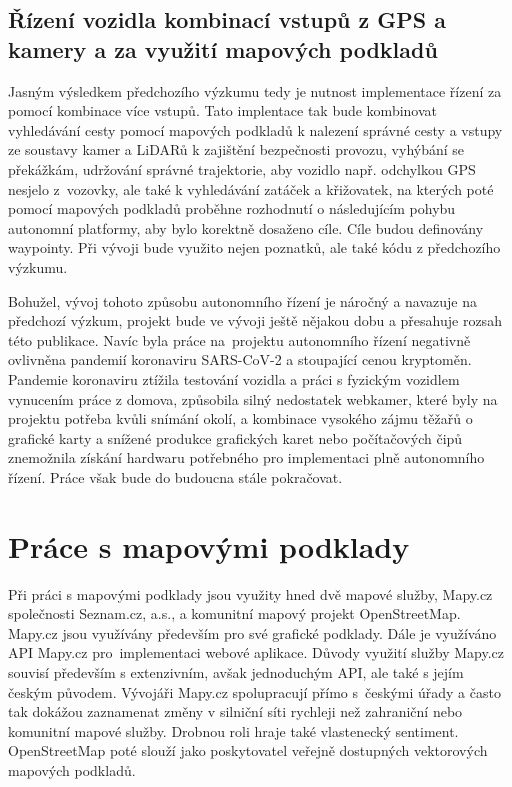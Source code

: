 \documentclass[czech, bachelor]{diploma}
\begin{document}
\section{Řízení vozidla kombinací vstupů z GPS a kamery a za využití mapových podkladů} \label{combination-of-driving-inputs}

Jasným výsledkem předchozího výzkumu tedy je nutnost implementace řízení za pomocí kombinace více vstupů. Tato implentace tak bude
kombinovat vyhledávání cesty pomocí mapových podkladů k nalezení správné cesty a vstupy ze soustavy kamer a LiDARů k zajištění
bezpečnosti provozu, vyhýbání se překážkám, udržování správné trajektorie, aby vozidlo např. odchylkou GPS nesjelo z~vozovky,
ale také k vyhledávání zatáček a křižovatek, na kterých poté pomocí mapových podkladů proběhne rozhodnutí o následujícím pohybu
autonomní platformy, aby bylo korektně dosaženo cíle. Cíle budou definovány waypointy. Při vývoji bude využito nejen poznatků,
ale také kódu z předchozího výzkumu.

Bohužel, vývoj tohoto způsobu autonomního řízení je náročný a navazuje na předchozí výzkum, projekt bude ve vývoji ještě nějakou
dobu a přesahuje rozsah této publikace. Navíc byla práce na~projektu autonomního řízení negativně ovlivněna pandemií koronaviru
SARS-CoV-2\cite{pandemic-source} a stoupající cenou kryptoměn\cite{bitcoin-rally-source}. Pandemie koronaviru ztížila testování
vozidla a práci s fyzickým vozidlem vynucením práce z domova, způsobila silný nedostatek webkamer, které byly na projektu potřeba
kvůli snímání okolí, a kombinace vysokého zájmu těžařů o grafické karty a snížené produkce grafických karet nebo počítačových čipů
znemožnila získání hardwaru potřebného pro implementaci plně autonomního řízení\cite{bitcoin-miners-gpu-source,
webcam-shortage-source}. Práce však bude do budoucna stále pokračovat.

\chapter{Práce s mapovými podklady} \label{osm-chapter}

Při práci s mapovými podklady jsou využity hned dvě mapové služby, Mapy.cz\cite{mapycz-source} společnosti Seznam.cz, a.s., a
komunitní mapový projekt OpenStreetMap\cite{openstreetmap-source}. Mapy.cz jsou využívány především pro své grafické podklady.
Dále je využíváno API Mapy.cz\cite{apimapycz-source} pro~implementaci webové aplikace. Důvody využití služby Mapy.cz souvisí
především s extenzivním, avšak jednoduchým API, ale také s jejím českým původem. Vývojáři Mapy.cz spolupracují přímo s~českými
úřady a často tak dokážou zaznamenat změny v silniční síti rychleji než zahraniční nebo komunitní mapové služby. Drobnou roli
hraje také vlastenecký sentiment. OpenStreetMap poté slouží jako poskytovatel veřejně dostupných vektorových mapových podkladů.
\end{document}

